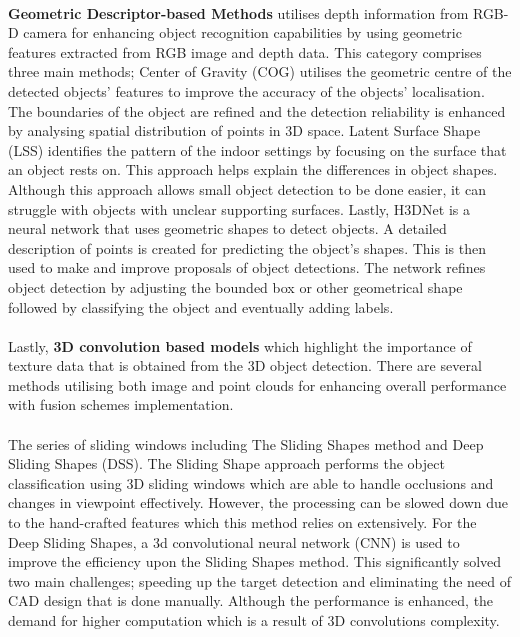 \paragraph*{}
\textbf{Geometric Descriptor-based Methods} utilises depth information from RGB-D camera for enhancing object recognition capabilities by using geometric features extracted from RGB image and depth data. This category comprises three main methods; Center of Gravity (COG) utilises the geometric centre of the detected objects’ features to improve the accuracy of the objects’ localisation. The boundaries of the object are refined and the detection reliability is enhanced by analysing spatial distribution of points in 3D space. Latent Surface Shape (LSS) identifies the pattern of the indoor settings by focusing on the surface that an object rests on. This approach helps explain the differences in object shapes. Although this approach allows small object detection to be done easier, it can struggle with objects with unclear supporting surfaces\cite{ren2018three}. Lastly, H3DNet\cite{zhang2020h3dnet} is a neural network that uses geometric shapes to detect objects. A detailed description of points is created for predicting the object's shapes. This is then used to make and improve proposals of object detections. The network refines object detection by adjusting the bounded box or other geometrical shape followed by classifying the object and eventually adding labels\cite{wang2021recent}.

\paragraph*{}
Lastly, \textbf{3D convolution based models} which highlight the importance of texture data that is obtained from the 3D object detection. There are several methods utilising both image and point clouds for enhancing overall performance with fusion schemes implementation. 

\paragraph*{}
The series of sliding windows including The Sliding Shapes method and Deep Sliding Shapes (DSS). The Sliding Shape approach performs the object classification using 3D sliding windows which are able to handle occlusions and changes in viewpoint effectively. However, the processing can be slowed down due to the hand-crafted features which this method relies on extensively. For the Deep Sliding Shapes, a 3d convolutional neural network (CNN) is used to improve the efficiency upon the Sliding Shapes method. This significantly solved two main challenges; speeding up the target detection and eliminating the need of CAD design that is done manually. Although the performance is enhanced, the demand for higher computation which is a result of 3D convolutions complexity. 

